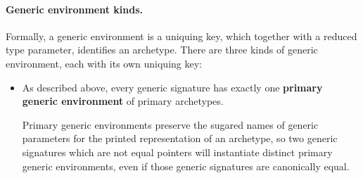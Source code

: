 \documentclass[../generics]{subfiles}
\begin{document}
\paragraph{Generic environment kinds.}
Formally, a generic environment is a uniquing key, which together with a reduced type parameter, identifies an archetype. There are three kinds of generic environment, each with its own uniquing key:
\begin{itemize}
\item As described above, every generic signature has exactly one \textbf{primary generic environment} of primary archetypes.
\begin{quote}
\end{quote}
Primary generic environments preserve the sugared names of generic parameters for the printed representation of an archetype, so two generic signatures which are not equal pointers will instantiate distinct primary generic environments, even if those generic signatures are canonically equal.


\end{itemize}
\end{document}
